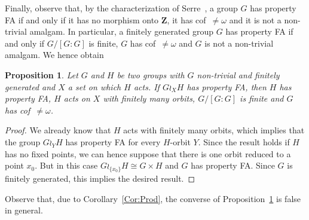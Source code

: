 \documentclass[a4paper]{article}
\newtheorem{prop}[lem]{Proposition}
\theoremstyle{definition}
\newcommand*{\field}[1]{\mathbf{#1}}
\newcommand*{\Z}{\field{Z}}
\begin{document}
Finally, observe that, by the characterization of Serre~\cite{MR0476875}, a group $G$ has property FA if and only if it has no morphism onto $\Z$, it has cof~$\neq\omega$ and it is not a non-trivial amalgam. In particular, a finitely generated group $G$ has property FA if and only if $G/[G:G]$ is finite, $G$ has cof~$\neq\omega$ and $G$ is not a non-trivial amalgam.
We hence obtain
%
%
\begin{prop}\label{Prop:FACKFG}
Let $G$ and $H$ be two groups with $G$ non-trivial and finitely generated and $X$ a set on which $H$ acts.
If $G\wr_XH$ has property FA, then $H$ has property FA, $H$ acts on $X$ with finitely many orbits, $G/[G:G]$ is finite and $G$ has cof~$\neq\omega$.
\end{prop}
\begin{proof}
We already know that $H$ acts with finitely many orbits, which implies that the group $G\wr_YH$ has property FA for every $H$-orbit $Y$.
Since the result holds if $H$ has no fixed points, we can hence suppose that there is one orbit reduced to a point $x_0$.
But in this case $G\wr_{\{x_0\}}H\cong G\times H$ and $G$ has property FA. Since $G$ is finitely generated, this implies the desired result.
\end{proof}
%
%
Observe that, due to Corollary~\ref{Cor:Prod}, the converse of Proposition~\ref{Prop:FACKFG} is false in general.
%
%
%
%
%
%
%
%
%
%
\end{document}

